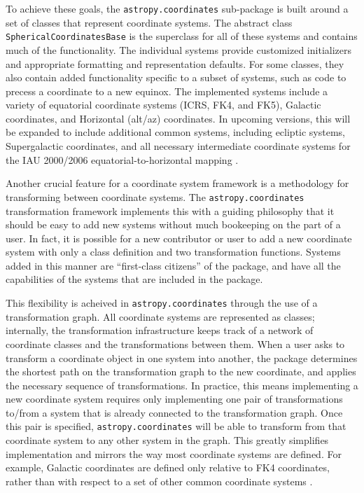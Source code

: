 \documentclass[traditabstract]{aa}
\begin{document}
To achieve these goals, the \texttt{astropy.coordinates} sub-package
is built around a set of classes that represent coordinate systems.
The abstract class \texttt{SphericalCoordinatesBase} is the superclass
for all of these systems and contains much of the functionality.  The
individual systems provide customized initializers and appropriate
formatting and representation defaults.  For some classes, they also
contain added functionality specific to a subset of systems, such as
code to precess a coordinate to a new equinox.  The implemented
systems include a variety of equatorial coordinate systems (ICRS, FK4,
and FK5), Galactic coordinates, and Horizontal (alt/az) coordinates.
In upcoming versions, this will be expanded to include additional
common systems, including ecliptic systems, Supergalactic coordinates,
and all necessary intermediate coordinate systems for the IAU
2000/2006 equatorial-to-horizontal mapping \citep[e.g.,][]{soffel03,
  usnocircular179}.




Another crucial feature for a coordinate system framework is a methodology for
transforming between coordinate systems. The \texttt{astropy.coordinates}
transformation framework implements this with a guiding philosophy that it
should be easy to add new systems without much bookeeping on the part of a
user.  In fact, it is possible for a new contributor or user to add a new
coordinate system with only a class definition and two transformation
functions.  Systems added in this manner are ``first-class citizens'' of the
package, and have all the capabilities of the systems that are included in the
package.

This flexibility is acheived in \texttt{astropy.coordinates} through the use
of a transformation graph.
All coordinate systems are represented as classes; internally, the
transformation infrastructure keeps track of a network of coordinate classes and
the transformations between them.  When a user asks to transform a coordinate
object in one system into another, the package determines the shortest path on
the transformation graph to the new coordinate, and applies the necessary
sequence of transformations.  In practice, this means
implementing a new coordinate system requires only implementing one
pair of transformations to/from a system that is already connected to the
transformation graph.  Once this pair is specified,
\texttt{astropy.coordinates} will be able to transform from that coordinate
system to any other system in the graph.  This greatly simplifies
implementation and mirrors the way most coordinate systems are
defined.  For example, Galactic coordinates are defined only relative to FK4
coordinates, rather than with respect to a set of other common coordinate
systems \citep{galcoords, reid04}.
\end{document}
